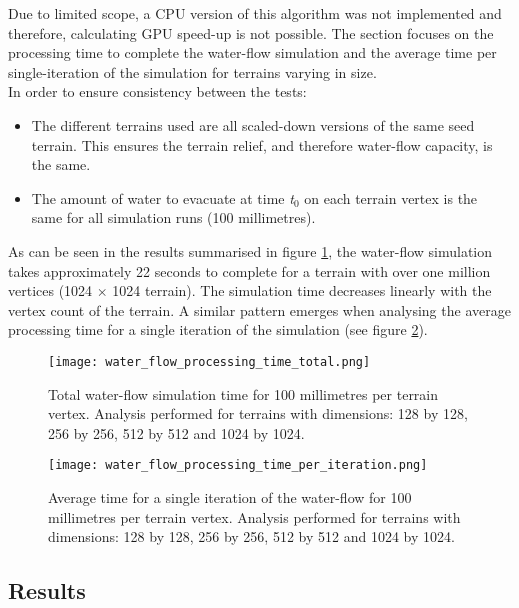 Due to limited scope, a CPU version of this algorithm was not implemented and therefore, calculating GPU speed-up is not possible. The section focuses on the processing time to complete the water-flow simulation and the average time per single-iteration of the simulation for terrains varying in size. \\
In order to ensure consistency between the tests:
\begin{itemize}
\item The different terrains used are all scaled-down versions of the same seed terrain. This ensures the terrain relief, and therefore water-flow capacity, is the same.\\
\item The amount of water to evacuate at time \textit{t$_{0}$} on each terrain vertex is the same for all simulation runs (100 millimetres). \\
\end{itemize}

As can be seen in the results summarised in figure \ref{fig:water_flow_processing_time_total}, the water-flow simulation takes approximately 22 seconds to complete for a terrain with over one million vertices (1024 $\times$ 1024 terrain). The simulation time decreases linearly with the vertex count of the terrain. A similar pattern emerges when analysing the average processing time for a single iteration of the simulation (see figure \ref{fig:water_flow_processing_time_per_iteration}).

\begin{figure}
\center
	\texttt{[image: water\_flow\_processing\_time\_total.png]}
	\caption{ Total water-flow simulation time for 100 millimetres per terrain vertex. Analysis performed for terrains with dimensions: 128 by 128, 256 by 256, 512 by 512 and 1024 by 1024.}
	\label{fig:water_flow_processing_time_total}
\end{figure}

\begin{figure}
\center
	\texttt{[image: water\_flow\_processing\_time\_per\_iteration.png]}
	\caption{ Average time for a single iteration of the water-flow for 100 millimetres per terrain vertex. Analysis performed for terrains with dimensions: 128 by 128, 256 by 256, 512 by 512 and 1024 by 1024.}
	\label{fig:water_flow_processing_time_per_iteration}
\end{figure}

\subsection{Results}

